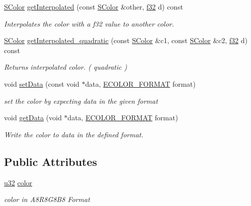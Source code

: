 \begin{DoxyCompactItemize}
\hyperlink{classirr_1_1video_1_1SColor}{S\+Color} \hyperlink{classirr_1_1video_1_1SColor_a20bfa471b5cf672db83355c181a3cae6}{get\+Interpolated} (const \hyperlink{classirr_1_1video_1_1SColor}{S\+Color} \&other, \hyperlink{namespaceirr_a0277be98d67dc26ff93b1a6a1d086b07}{f32} d) const
\begin{DoxyCompactList}\small\item\em Interpolates the color with a f32 value to another color. \end{DoxyCompactList}\item 
\hyperlink{classirr_1_1video_1_1SColor}{S\+Color} \hyperlink{classirr_1_1video_1_1SColor_addb63c4b8832c9bb01e4861e692e5f4f}{get\+Interpolated\+\_\+quadratic} (const \hyperlink{classirr_1_1video_1_1SColor}{S\+Color} \&c1, const \hyperlink{classirr_1_1video_1_1SColor}{S\+Color} \&c2, \hyperlink{namespaceirr_a0277be98d67dc26ff93b1a6a1d086b07}{f32} d) const
\begin{DoxyCompactList}\small\item\em Returns interpolated color. ( quadratic ) \end{DoxyCompactList}\item 
void \hyperlink{classirr_1_1video_1_1SColor_a381f2db0ed17c6b06ba5c8809dce3370}{set\+Data} (const void $\ast$data, \hyperlink{namespaceirr_1_1video_a1d5e487888c32b1674a8f75116d829ed}{E\+C\+O\+L\+O\+R\+\_\+\+F\+O\+R\+M\+AT} format)
\begin{DoxyCompactList}\small\item\em set the color by expecting data in the given format \end{DoxyCompactList}\item 
void \hyperlink{classirr_1_1video_1_1SColor_a7cba1b914230289de9c91ff28be96bc9}{get\+Data} (void $\ast$data, \hyperlink{namespaceirr_1_1video_a1d5e487888c32b1674a8f75116d829ed}{E\+C\+O\+L\+O\+R\+\_\+\+F\+O\+R\+M\+AT} format)
\begin{DoxyCompactList}\small\item\em Write the color to data in the defined format. \end{DoxyCompactList}\end{DoxyCompactItemize}
\subsection*{Public Attributes}
\begin{DoxyCompactItemize}
\item 
\mbox{\label{classirr_1_1video_1_1SColor_a11f2b41eeff9e7f688d322735ca2cfcf}} 
\hyperlink{namespaceirr_a0416a53257075833e7002efd0a18e804}{u32} \hyperlink{classirr_1_1video_1_1SColor_a11f2b41eeff9e7f688d322735ca2cfcf}{color}
\begin{DoxyCompactList}\small\item\em color in A8\+R8\+G8\+B8 Format \end{DoxyCompactList}\end{DoxyCompactItemize}



